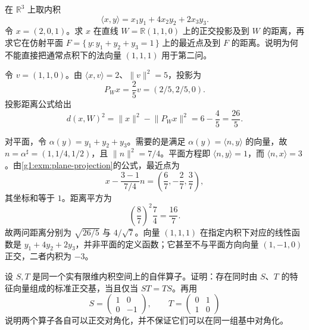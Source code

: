 
\begin{exercise}
	\label{g1:ex:weighted-projection}
	在 \(\mathbb R^3\) 上取内积
	\[
		\langle x,y\rangle=x_1y_1+4x_2y_2+2x_3y_3.
	\]
	令 \(x=(2,0,1)\)。求 \(x\) 在直线 \(W=\mathbb R(1,1,0)\) 上的正交投影及到 \(W\) 的距离，再求它在仿射平面 \(F=\{\,y:y_1+y_2+y_3=1\,\}\) 上的最近点及到 \(F\) 的距离。说明为何不能直接把通常点积下的法向量 \((1,1,1)\) 用于第二问。
\end{exercise}

\begin{solution}
	令 \(v=(1,1,0)\)。由 \(\langle x,v\rangle=2\)、\(\lVert v\rVert^2=5\)，投影为
	\[
		P_Wx=\frac25v=(2/5,2/5,0).
	\]
	投影距离公式给出
	\[
		d(x,W)^2=\lVert x\rVert^2-\lVert P_Wx\rVert^2
		=6-\frac45=\frac{26}{5}.
	\]

	对平面，令 \(\alpha(y)=y_1+y_2+y_3\)。需要的是满足 \(\alpha(y)=\langle n,y\rangle\) 的向量，故 \(n=\alpha^\sharp=(1,1/4,1/2)\)，且 \(\lVert n\rVert^2=7/4\)。平面方程即 \(\langle n,y\rangle=1\)，而 \(\langle n,x\rangle=3\)。由\cref{g1:exm:plane-projection}的公式，最近点为
	\[
		x-\frac{3-1}{7/4}n
		=\left(\frac67,-\frac27,\frac37\right),
	\]
	其坐标和等于 \(1\)。距离平方为
	\[
		\left(\frac87\right)^2\frac74=\frac{16}{7}.
	\]
	故两问距离分别为 \(\sqrt{26/5}\) 与 \(4/\sqrt7\)。向量 \((1,1,1)\) 在指定内积下对应的线性函数是 \(y_1+4y_2+2y_3\)，并非平面的定义函数；它甚至不与平面方向向量 \((1,-1,0)\) 正交，二者内积为 \(-3\)。
\end{solution}

\begin{exercise}
	\label{g1:ex:simultaneous-spectral}
	设 \(S,T\) 是同一个实有限维内积空间上的自伴算子。证明：存在同时由 \(S\)、\(T\) 的特征向量组成的标准正交基，当且仅当 \(ST=TS\)。再用
	\[
		S=\begin{pmatrix}1&0\\0&-1\end{pmatrix},\qquad
		T=\begin{pmatrix}0&1\\1&0\end{pmatrix}
	\]
	说明两个算子各自可以正交对角化，并不保证它们可以在同一组基中对角化。
\end{exercise}

